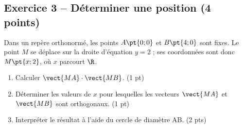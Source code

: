 \subsection*{Exercice 3 -- Déterminer une position (4 points)}
Dans un repère orthonormé, les points $A\pt{0;0}$ et $B\pt{4;0}$ sont fixes. Le point $M$ se déplace sur la droite d’équation $y=2$ ; ses coordonnées sont donc $M\pt{x;2}$, où $x$ parcourt $\R$.
\begin{enumerate}
\item Calculer $\vect{MA}\cdot\vect{MB}$. \hfill(1 pt)
\item Déterminer les valeurs de $x$ pour lesquelles les vecteurs $\vect{MA}$ et $\vect{MB}$ sont orthogonaux. \hfill(1 pt)
\item Interpréter le résultat à l’aide du cercle de diamètre AB. \hfill(2 pts)
\end{enumerate}
